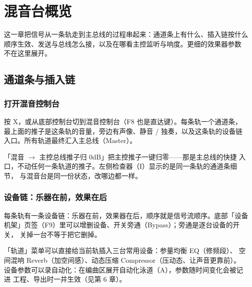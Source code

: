 
\chapter{混音台概览}
\label{ch:mixer-overview}






这一章把信号从一条轨走到主总线的过程串起来：通道条上有什么、插入链按什么
顺序生效、发送与总线怎么接，以及在哪看主控监听与响度。更细的效果器参数
不在这里展开。

\section{通道条与插入链}

\subsection{打开混音控制台}

按 X，或从底部控制台切到混音控制台（F8 也是直达键）。每条轨一个通道条，
最上面的推子是这条轨的音量，旁边有声像、静音 / 独奏，以及这条轨的设备链
入口。所有轨道最终汇入主总线（Master）。

「混音 $\to$ 主控总线推子归 0dB」把主控推子一键归零——那是主总线的快捷
入口，不动任何一条轨道的推子。左侧检查器（I）显示的是同一条轨的通道条细节，
与混音台是同一份状态，改哪边都一样。


\subsection{设备链：乐器在前，效果在后}

每条轨有一条设备链：乐器在前，效果器在后，顺序就是信号流顺序。底部「设备
机架」页签（F9）里可以增删设备、开关旁通（Bypass）；旁通是逐台设备的开关，
关掉一台不等于把它删掉。

「轨道」菜单可以直接给当前轨插入三台常用设备：参量均衡 EQ（修频段）、
空间混响 Reverb（加空间感）、动态压缩 Compressor（压动态、让声音更靠前）。
设备参数可以录自动化：在编曲区展开自动化泳道（A），参数随时间变化会被记进
工程、导出时一并生效（见第 6 章）。


